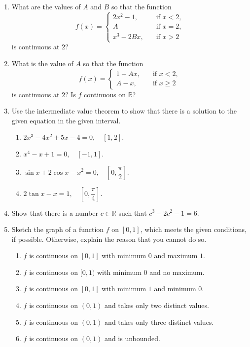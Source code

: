 \documentclass[11pt]{book}
\theoremstyle{break}
\theoremstyle{no_label}
\newcommand{\bbR}{\mathbb{R}}
\numberwithin{equation}{section}
\begin{document}
\begin{enumerate}[label=\arabic*.]
    \item What are the values of $A$ and $B$ so that the function $$f(x)=\left\{\begin{array}{rl}
        2x^2-1, \quad & \text{if $x<2$},\\
        A \quad &\text{if $x=2$},\\
        x^3-2Bx, \quad & \text{if $x>2$}
    \end{array}\right.$$ is continuous at $2$?
    \item What is the value of $A$ so that the function $$f(x)=\left\{\begin{array}{rl}
        1+Ax, \quad & \text{if $x<2$},\\
        A-x, \quad & \text{if $x\geq2$}
    \end{array}\right.$$ is continuous at $2$? Is $f$ continuous on $\bbR$?
    \item Use the intermediate value theorem to show that there is a solution to the given equation in the given interval. 
    \begin{enumerate} \setlength{\delimitershortfall}{0pt}
        \item $2x^3-4x^2+5x-4=0, \quad [1, 2]$.
        \item $x^4-x+1=0, \quad [-1, 1]$.
        \item $\sin x+2\cos x-x^2=0, \quad \left[0, \dfrac{\pi}{2}\right]$.
        \item $2\tan x-x=1,\quad \left[0, \dfrac{\pi}{4}\right]$.
    \end{enumerate} \setlength{\delimitershortfall}{13.5pt}
    \item Show that there is a number $c\in\bbR$ such that $c^3-2c^2-1=6$.
    \item Sketch the graph of a function $f$ on $[0, 1]$, which meets the given conditions, if possible. Otherwise, explain the reason that you cannot do so.
    \begin{enumerate}
        \item $f$ is continuous on $[0, 1]$ with minimum $0$ and maximum $1$.
        \item $f$ is continuous on $[0, 1)$ with minimum $0$ and no maximum.
        \item $f$ is continuous on $[0, 1]$ with minimum $1$ and minimum $0$.
        \item $f$ is continuous on $(0, 1)$ and takes only two distinct values.
        \item $f$ is continuous on $(0, 1)$ and takes only three distinct values.
        \item $f$ is continuous on $(0, 1)$ and is unbounded.

\end{enumerate}
\end{enumerate}
\end{document}
